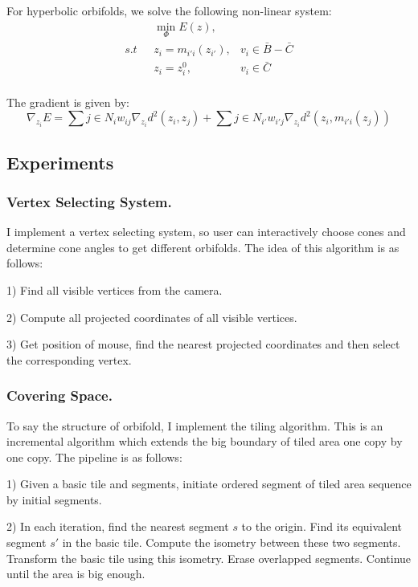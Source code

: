 For hyperbolic orbifolds, we solve the following non-linear system:
\begin{equation}
\begin{split}
&\min_{\Phi} E(z),&\\
s.t \ \ \ &z_i = m_{i'i}(z_{i'}), &v_i \in \bar{B} - \bar{C}\\
 &z_i = z_i^0, &v_i \in \bar{C}\\
\end{split}
\end{equation}

The gradient is given by:
\begin{equation}
\nabla_{z_i} E = \sum{j\in N_i}  w_{ij}\nabla_{z_i}d^2(z_i, z_j) + \sum{j\in N_{i'}}w_{i'j}\nabla_{z_i}d^2(z_i, m_{i'i}(z_j))
\end{equation}

\subsection{Experiments}
\subsubsection{Vertex Selecting System.} 
I implement a vertex selecting system, so user can interactively choose cones and determine cone angles to get different orbifolds. The idea of this algorithm is as follows:

1) Find all visible vertices from the camera.

2) Compute all projected coordinates of all visible vertices.

3) Get position of mouse, find the nearest projected coordinates and then select the corresponding vertex.

\subsubsection{Covering Space.} 
To say the structure of orbifold, I implement the tiling algorithm. This is an incremental algorithm which extends the big boundary of tiled area one copy by one copy. The pipeline is as follows:

1) Given a basic tile and segments, initiate ordered segment of tiled area sequence by initial segments.

2) In each iteration, find the nearest segment $s$ to the origin. Find its equivalent segment $s'$ in the basic tile. Compute the isometry between these two segments. Transform the basic tile using this isometry. Erase overlapped segments. Continue until the area is big enough.

